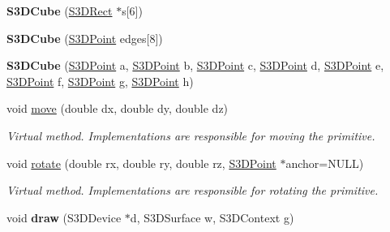 \begin{DoxyCompactItemize}
\item 
\hypertarget{class_s3_d_cube_a071b56f85b667b74d0056d0d554d3647}{
{\bfseries S3DCube} (\hyperlink{class_s3_d_rect}{S3DRect} $\ast$s\mbox{[}6\mbox{]})}
\label{class_s3_d_cube_a071b56f85b667b74d0056d0d554d3647}

\item 
\hypertarget{class_s3_d_cube_a6bda81748dd5c23028611bf2863bcd69}{
{\bfseries S3DCube} (\hyperlink{class_s3_d_point}{S3DPoint} edges\mbox{[}8\mbox{]})}
\label{class_s3_d_cube_a6bda81748dd5c23028611bf2863bcd69}

\item 
\hypertarget{class_s3_d_cube_a96e5dcdd93eb3fcdcbadbce2f52e1890}{
{\bfseries S3DCube} (\hyperlink{class_s3_d_point}{S3DPoint} a, \hyperlink{class_s3_d_point}{S3DPoint} b, \hyperlink{class_s3_d_point}{S3DPoint} c, \hyperlink{class_s3_d_point}{S3DPoint} d, \hyperlink{class_s3_d_point}{S3DPoint} e, \hyperlink{class_s3_d_point}{S3DPoint} f, \hyperlink{class_s3_d_point}{S3DPoint} g, \hyperlink{class_s3_d_point}{S3DPoint} h)}
\label{class_s3_d_cube_a96e5dcdd93eb3fcdcbadbce2f52e1890}

\item 
\hypertarget{class_s3_d_cube_ab21a1988528297602452984f8a3c093e}{
void \hyperlink{class_s3_d_cube_ab21a1988528297602452984f8a3c093e}{move} (double dx, double dy, double dz)}
\label{class_s3_d_cube_ab21a1988528297602452984f8a3c093e}

\begin{DoxyCompactList}\small\item\em Virtual method. Implementations are responsible for moving the primitive. \item\end{DoxyCompactList}\item 
\hypertarget{class_s3_d_cube_a2e574649ca6ddd805c5ecdb7932f3ac1}{
void \hyperlink{class_s3_d_cube_a2e574649ca6ddd805c5ecdb7932f3ac1}{rotate} (double rx, double ry, double rz, \hyperlink{class_s3_d_point}{S3DPoint} $\ast$anchor=NULL)}
\label{class_s3_d_cube_a2e574649ca6ddd805c5ecdb7932f3ac1}

\begin{DoxyCompactList}\small\item\em Virtual method. Implementations are responsible for rotating the primitive. \item\end{DoxyCompactList}\item 
\hypertarget{class_s3_d_cube_a1e66a1dab7e99328fab61c2c86da7ba5}{
void {\bfseries draw} (S3DDevice $\ast$d, S3DSurface w, S3DContext g)}
\label{class_s3_d_cube_a1e66a1dab7e99328fab61c2c86da7ba5}


\end{DoxyCompactItemize}
